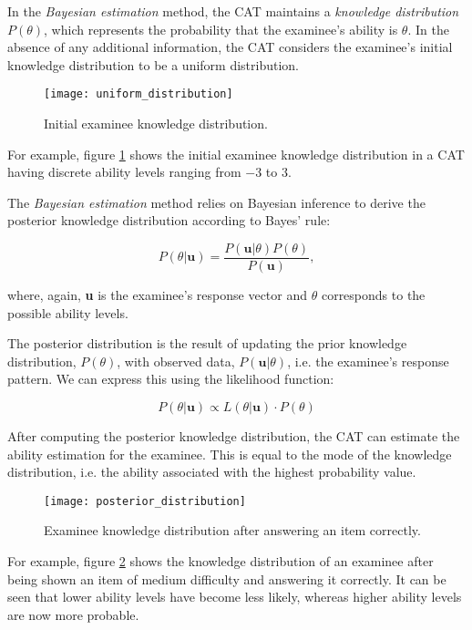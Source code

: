 In the \textit{Bayesian estimation} method, the CAT maintains a \textit{knowledge distribution} $P(\theta)$, which represents the probability that the examinee's ability is $\theta$. In the absence of any additional information, the CAT considers the examinee's initial knowledge distribution to be a uniform distribution.

\begin{figure}[H]
\centering
\texttt{[image: uniform\_distribution]}
\caption{Initial examinee knowledge distribution.}
\label{fig:uniform_distribution}
\end{figure}

For example, figure \ref{fig:uniform_distribution} shows the initial examinee knowledge distribution in a CAT having discrete ability levels ranging from $-3$ to $3$.\newline

The \textit{Bayesian estimation} method relies on Bayesian inference to derive the posterior knowledge distribution according to Bayes' rule:

$$P(\theta | \textbf{u}) = \dfrac{P(\textbf{u} | \theta)P(\theta)}{P(\textbf{u})} ,$$

where, again, \textbf{u} is the examinee's response vector and $\theta$ corresponds to the possible ability levels.\newline

The posterior distribution is the result of updating the prior knowledge distribution, $P(\theta)$, with observed data, $P(\textbf{u} | \theta)$, i.e. the examinee's response pattern. We can express this using the likelihood function:

$$P(\theta | \textbf{u}) \propto L(\theta | \textbf{u}) \cdot P(\theta)$$

After computing the posterior knowledge distribution, the CAT can estimate the ability estimation for the examinee. This is equal to the mode of the knowledge distribution, i.e. the ability associated with the highest probability value.

\begin{figure}[H]
\centering
\texttt{[image: posterior\_distribution]}
\caption{Examinee knowledge distribution after answering an item correctly.}
\label{fig:posterior_distribution}
\end{figure}

For example, figure \ref{fig:posterior_distribution} shows the knowledge distribution of an examinee after being shown an item of medium difficulty and answering it correctly. It can be seen that lower ability levels have become less likely, whereas higher ability levels are now more probable.\newline

